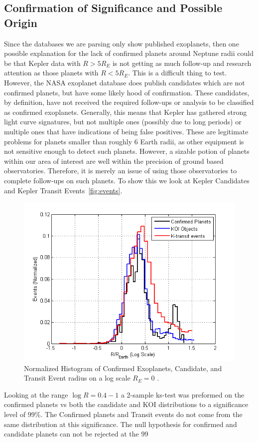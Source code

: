 \documentclass[
10pt, %
a4paper, %
oneside, %
headinclude,footinclude, %
BCOR5mm, %
]{scrartcl}
\begin{document}
\subsection{Confirmation of Significance and Possible Origin}
Since the databases we are parsing only show published exoplanets, then one possible explanation for the lack of confirmed planets around Neptune radii could be that Kepler data with $R > 5 R_{E}$ is not getting as much follow-up and research attention as those planets with $R < 5 R_{E}$. This is a difficult thing to test. However, the NASA exoplanet database does publish candidates which are not confirmed planets, but have some likely hood of confirmation. These candidates, by definition, have not received the required follow-ups or analysis to be classified as confirmed exoplanets. Generally, this means that Kepler has gathered strong light curve signatures, but not multiple ones (possibly due to long periods) or multiple ones that have indications of being false positives. These are legitimate problems for planets smaller than roughly 6 Earth radii, as other equipment is not sensitive enough to detect such planets. However, a sizable potion of planets within our area of interest are well within the precision of ground based observatories. Therefore, it is merely an issue of using those observatories to complete follow-ups on such planets. To show this we look at Kepler Candidates and Kepler Transit Events~\vref{fig:events}.
\begin{figure}[tb]
\centering 
\includegraphics[width=1\columnwidth]{Radius_EventsNormalized} 
\caption[Kepler Events]{Normalized Histogram of Confirmed Exoplanets, Candidate, and Transit Event radius on a log scale $R_{E}=0$ .}
\label{fig:events} 
\end{figure}
Looking at the range $\log{R}=0.4 - 1$ a 2-sample ks-test was preformed on the confirmed planets vs both the candidate and KOI distributions to a significance level of 99\%. The Confirmed planets and Transit events do not come from the same distribution at this significance. The null hypothesis for confirmed and candidate planets can not be rejected at the 99%
\end{document}
